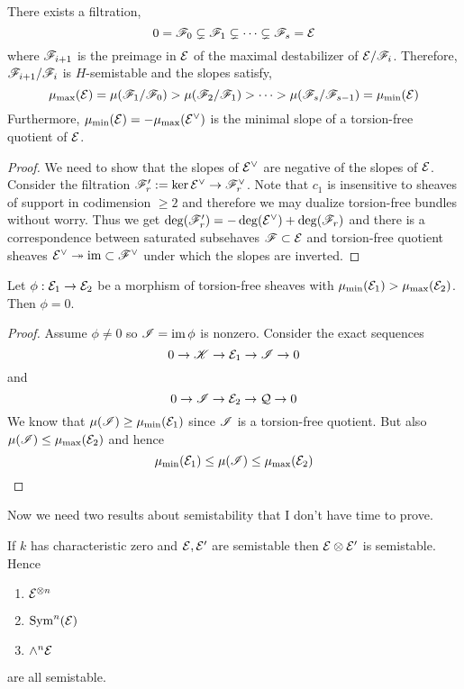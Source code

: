 \documentclass[12pt]{article}
\begin{document}
\begin{cor}
There exists a filtration,
\[ 0 = \mathscr{F}_0 \subsetneq \mathscr{F}_1 \subsetneq \cdots \subsetneq \mathscr{F}_s = \mathcal{E} \]
where $\mathscr{F}_{i+1}$ is the preimage in $\mathcal{E}$ of the maximal destabilizer of $\mathcal{E} / \mathscr{F}_{i}$. Therefore, $\mathscr{F}_{i+1} / \mathscr{F}_i$ is $H$-semistable and the slopes satisfy,
\[ \mu_{\max}(\mathcal{E}) = \mu(\mathscr{F}_1 / \mathscr{F}_0) > \mu(\mathscr{F}_2 / \mathscr{F}_1) > \cdots > \mu(\mathscr{F}_s / \mathscr{F}_{s-1}) = \mu_{\min}(\mathcal{E}) \]
Furthermore, $\mu_{\min}(\mathcal{E}) = - \mu_{\max}(\mathcal{E}^\vee)$ is the minimal slope of a torsion-free quotient of $\mathcal{E}$. 
\end{cor}

\begin{proof}
We need to show that the slopes of $\mathcal{E}^\vee$ are negative of the slopes of $\mathcal{E}$. Consider the filtration $\mathscr{F}'_r := \ker{\mathcal{E}^\vee \to \mathscr{F}_r^\vee}$. Note that $c_1$ is insensitive to sheaves of support in codimension $\ge 2$ and therefore we may dualize torsion-free bundles without worry. Thus we get $\deg(\mathscr{F}'_r) = -\deg(\mathcal{E}^\vee) + \deg(\mathscr{F}_r)$ and there is a correspondence between saturated subsehaves $\mathscr{F} \subset \mathcal{E}$ and torsion-free quotient sheaves $\mathcal{E}^\vee \twoheadrightarrow \operatorname{\mathrm{im}} \subset \mathscr{F}^\vee$ under which the slopes are inverted. 
\end{proof}

\newcommand{\cQ}{\mathcal{Q}}

\begin{lemma}
Let $\phi : \mathcal{E}_1 \to \mathcal{E}_2$ be a morphism of torsion-free sheaves with $\mu_{\min}(\mathcal{E}_1) > \mu_{\max}(\mathcal{E}_2)$. Then $\phi = 0$.
\end{lemma}

\begin{proof}
Assume $\phi \neq 0$ so $\mathscr{I} = \operatorname{\mathrm{im}}{\phi}$ is nonzero. Consider the exact sequences
\[ 0 \to \mathscr{K} \to \mathcal{E}_1 \to \mathscr{I} \to 0 \]
and
\[ 0 \to \I \to \E_2 \to \cQ \to 0 \]
We know that $\mu(\mathscr{I}) \ge \mu_{\min}(\mathcal{E}_1)$ since $\mathscr{I}$ is a torsion-free quotient. But also $\mu(\mathscr{I}) \le \mu_{\max}(\mathcal{E}_2)$ and hence 
\[ \mu_{\min}(\mathcal{E}_1) \le \mu(\mathscr{I}) \le \mu_{\max}(\mathcal{E}_2) \]
\end{proof}

Now we need two results about semistability that I don't have time to prove.

\begin{lemma}
If $k$ has characteristic zero and $\mathcal{E}, \mathcal{E}'$ are semistable then $\mathcal{E} \otimes \mathcal{E}'$ is semistable. Hence 
\begin{enumerate}
\item $\mathcal{E}^{\otimes n}$ 
\item $\mathrm{Sym}^{n}\! \left( \mathcal{E} \right)$
\item $\wedge^n \mathcal{E}$
\end{enumerate} 
are all semistable.
\end{lemma}
\end{document}
